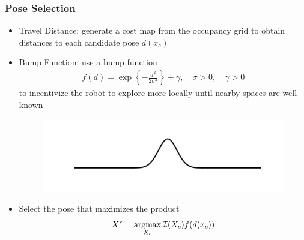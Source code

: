 \documentclass[11pt,professionalfonts,hyperref={pdftex,pdfpagemode=none,pdfstartview=FitH}]{beamer}
\newcommand{\braces}[1]{\ensuremath{\left\{ #1 \right\}}}
\newcommand{\argmax}{\operatornamewithlimits{argmax}}
\begin{document}
\begin{frame}
\frametitle{Pose Selection}

\begin{itemize}
	\item Travel Distance: generate a cost map from the occupancy grid to obtain distances to each candidate pose $d(x_c)$
	\vspace*{0.0cm}\pause
	\item Bump Function: use a bump function \begin{align*}f(d)=\exp\braces{-\frac{d^2}{2\sigma^2}}+\gamma, \quad \sigma>0, \quad \gamma>0\end{align*} to incentivize the robot to explore more locally until nearby spaces are well-known
	\begin{figure}
	\vspace*{-0.015\linewidth}
\centering
	\includegraphics[width=0.8\linewidth]{GaussianBumpFunFlat.png}
		\vspace*{-0.015\linewidth}
\end{figure}
	\vspace*{0.0cm}\pause
	\item Select the pose that maximizes the product \begin{align*}X^*=\argmax_{X_c}{\mathcal I(X_c)f(d(x_c))}\end{align*}
\end{itemize}

\end{frame}
\end{document}
